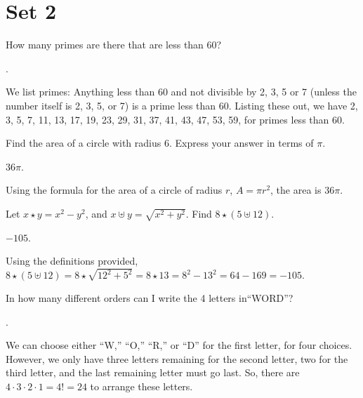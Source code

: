 \documentclass[11pt]{article}
\begin{document}
\eject

\section*{Set 2}

\begin{problem}How many primes are there that are less than 60?
\end{problem}

\begin{answer} . \end{answer}
\begin{solution}
We list primes: Anything less than 60 and not divisible by 2, 3, 5 or 7 (unless the number itself is 2, 3, 5, or 7) is a prime less than 60. Listing these out, we have 2, 3, 5, 7, 11, 13, 17, 19, 23, 29, 31, 37, 41, 43, 47, 53, 59, for  primes less than 60.
\end{solution}

\begin{problem}Find the area of a circle with radius 6. Express your answer in terms of $\pi$.
\end{problem}

\begin{answer} $\boxed{36\pi}$. \end{answer}
\begin{solution}
Using the formula for the area of a circle of radius $r$, $A = \pi r^2$, the area is $\boxed{36 \pi}$.
\end{solution}

\begin{problem} Let $x \star y = x^2 - y^2$, and $x \uplus y = \sqrt{x^2 + y^2}$. Find $8 \star (5 \uplus 12)$.
\end{problem}

\begin{answer} $\boxed{-105}$. \end{answer}
\begin{solution}
Using the definitions provided, $8 \star (5 \uplus 12) = 8 \star \sqrt{12^2 + 5^2} = 8 \star 13 = 8^2 - 13^2 = 64 - 169 = \boxed{-105}.$
\end{solution}

\begin{problem}In how many different orders can I write the 4 letters in``WORD''?
\end{problem}

\begin{answer} . \end{answer}
\begin{solution}
We can choose either ``W,'' ``O,'' ``R,'' or ``D'' for the first letter, for four choices. However, we only have three letters remaining for the second letter, two for the third letter, and the last remaining letter must go last. So, there are $4 \cdot 3 \cdot 2 \cdot 1 = 4! = \boxed{24}$ to arrange these letters.
\end{solution}
\end{document}
